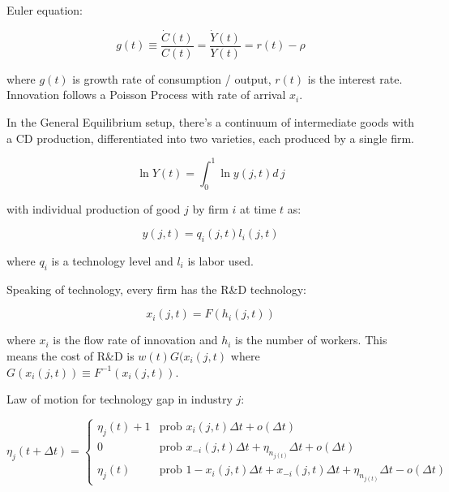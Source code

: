 \documentclass[11pt]{article}
\begin{document}
  Euler equation:

  \begin{equation}
    g(t) \equiv \frac{\dot{C}(t)}{C(t)} = \frac{\dot{Y}(t)}{Y(t)} = r(t) - \rho
  \end{equation}

  where $g(t)$ is growth rate of consumption / output, $r(t)$ is the interest rate.
  Innovation follows a Poisson Process with rate of arrival $x_i$.

  In the General Equilibrium setup, there's a continuum of intermediate goods with a CD production, differentiated into two varieties, each produced by a single firm.

  \begin{equation} \label{eq:tech_output}
    \ln Y(t) = \int_{0}^{1} \ln y(j, t) d\,j 
  \end{equation}

  with individual production of good $j$ by firm $i$ at time $t$ as:

  \begin{equation}
    y(j, t) = q_i(j, t)l_i(j, t)
  \end{equation}

  where $q_i$ is a technology level and $l_i$ is labor used.

  Speaking of technology, every firm has the R\&D technology:

  \begin{equation} \label{eq:tech_rd_technology}
    x_i(j, t) = F(h_i(j, t))
  \end{equation}

  where $x_i$ is the flow rate of innovation and $h_i$ is the number of workers.  This means the cost of R\&D is $w(t)G(x_i(j,t)$ where $G(x_i(j,t)) \equiv F^{-1}(x_i(j,t))$.

  Law of motion for technology gap in industry $j$:

  \begin{equation} \label{eq:tech_law_of_motion}
    \eta_j(t + \Delta t) =
    \begin{cases}
      \eta_j(t) + 1 & \textrm{prob } x_i(j,t)\Delta t + o(\Delta t)\\
      0 & \textrm{prob } x_{-i}(j,t)\Delta t + \eta_{n_{j(t)}}\Delta t + o(\Delta t) \\
      \eta_j(t) & \textrm{prob } 1 - x_i(j,t)\Delta t + x_{-i}(j,t)\Delta t + \eta_{n_{j(t)}}\Delta t - o(\Delta t)
    \end{cases}
  \end{equation}
\end{document}
